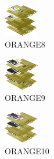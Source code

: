 \hspace{0.1cm}
\begin{minipage}[b]{0.15\linewidth}
\begin{figure}[H]                                                          
  \centering                                                             
  \begin{adjustbox}{width=1.5cm,center}                                   
  \includegraphics[width=1.5cm]{src/colorspace_colourflow/flows/colourflow_248-45.png}%
  \end{adjustbox}                                                        
\caption*{ORANGE8}                                           
\end{figure}                                                               
\end{minipage}
\hspace{0.1cm}
\begin{minipage}[b]{0.15\linewidth}
\begin{figure}[H]                                                          
  \centering                                                             
  \begin{adjustbox}{width=1.5cm,center}                                   
  \includegraphics[width=1.5cm]{src/colorspace_colourflow/flows/colourflow_249-45.png}%
  \end{adjustbox}                                                        
\caption*{ORANGE9}                                           
\end{figure}                                                               
\end{minipage}
\hspace{0.1cm}
\begin{minipage}[b]{0.15\linewidth}
\begin{figure}[H]                                                          
  \centering                                                             
  \begin{adjustbox}{width=1.5cm,center}                                   
  \includegraphics[width=1.5cm]{src/colorspace_colourflow/flows/colourflow_250-45.png}%
  \end{adjustbox}                                                        
\caption*{ORANGE10}                                           
\end{figure}                                                               
\end{minipage}
